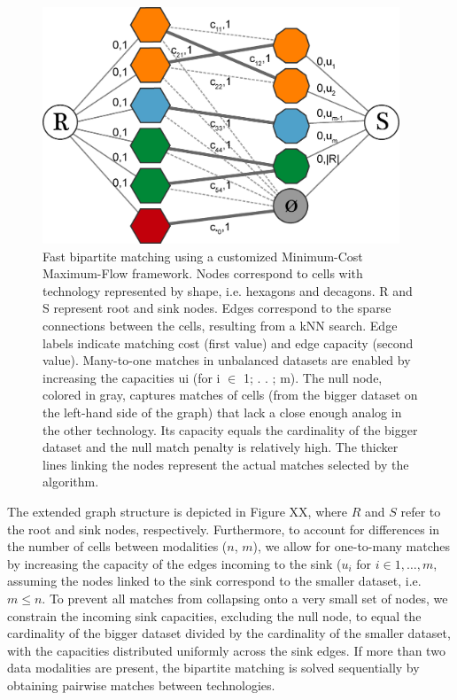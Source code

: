 \begin{figure}
  \begin{center}
    \includegraphics[width=0.95\textwidth]{figures/integration/null-cell.png}
  \end{center}
  \caption{Fast bipartite matching using a customized Minimum-Cost Maximum-Flow framework. Nodes correspond to cells with technology represented by shape, i.e. hexagons and decagons. R and S represent root and sink nodes. Edges correspond to the sparse connections between the cells, resulting from a kNN search. Edge labels indicate matching cost (first value) and edge capacity (second value). Many-to-one matches in unbalanced datasets are enabled by increasing the capacities ui (for i $\in$ 1;  . . ; m). The null node, colored in gray, captures matches of cells (from the bigger dataset on the left-hand side of the graph) that lack a close enough analog in the other technology. Its capacity equals the cardinality of the bigger dataset and the null match penalty is relatively high. The thicker lines linking the nodes represent the actual matches selected by the algorithm.}
  \label{fig:null-cell}
\end{figure}

The extended graph structure is depicted in Figure XX, where $R$ and $S$ refer to the root and sink nodes, respectively.
Furthermore, to account for differences in the number of cells between modalities ($n$, $m$), we allow for one-to-many matches by increasing the capacity of the edges incoming to the sink ($u_i$ for $i \in {1, \ldots, m}$, assuming the nodes linked to the sink correspond to the smaller dataset, i.e. $m \leq n$.
To prevent all matches from collapsing onto a very small set of nodes, we constrain the incoming sink capacities, excluding the null node, to equal the cardinality of the bigger dataset divided by the cardinality of the smaller dataset, with the capacities distributed uniformly across the sink edges.
If more than two data modalities are present, the bipartite matching is solved sequentially by obtaining pairwise matches between technologies.
